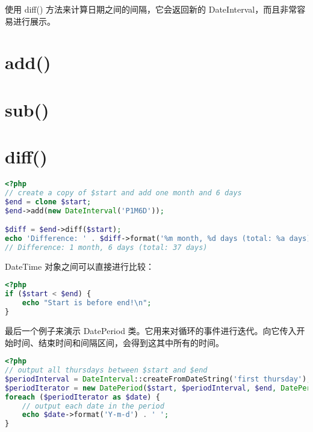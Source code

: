 使用 diff() 方法来计算日期之间的间隔，它会返回新的 DateInterval，而且非常容易进行展示。

\section{add()}



\section{sub()}


\section{diff()}


\begin{lstlisting}[language=PHP]
<?php
// create a copy of $start and add one month and 6 days
$end = clone $start;
$end->add(new DateInterval('P1M6D'));

$diff = $end->diff($start);
echo 'Difference: ' . $diff->format('%m month, %d days (total: %a days)') . "\n";
// Difference: 1 month, 6 days (total: 37 days)
\end{lstlisting}

DateTime 对象之间可以直接进行比较：



\begin{lstlisting}[language=PHP]
<?php
if ($start < $end) {
    echo "Start is before end!\n";
}
\end{lstlisting}

最后一个例子来演示 DatePeriod 类。它用来对循环的事件进行迭代。向它传入开始时间、结束时间和间隔区间，会得到这其中所有的时间。



\begin{lstlisting}[language=PHP]
<?php
// output all thursdays between $start and $end
$periodInterval = DateInterval::createFromDateString('first thursday');
$periodIterator = new DatePeriod($start, $periodInterval, $end, DatePeriod::EXCLUDE_START_DATE);
foreach ($periodIterator as $date) {
    // output each date in the period
    echo $date->format('Y-m-d') . ' ';
}
\end{lstlisting}



\begin{lstlisting}[language=PHP]

\end{lstlisting}



